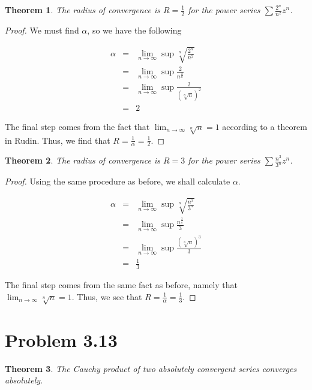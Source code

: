 \documentclass[psamsfonts]{amsart}
\newtheorem{thm}{Theorem}[section]
\theoremstyle{definition}
\theoremstyle{remark}
\numberwithin{equation}{section}
\begin{document}
\begin{thm}
The radius of convergence is $R = \frac{1}{2} $ for the power series $\sum \frac{2^n}{n^2} z^n$. 
\end{thm}

\begin{proof}
We must find $\alpha$, so we have the following

\begin{eqnarray}
\alpha &=&  \lim_{n \to \infty} \sup \sqrt[n]{\frac{2^n}{n^2}} \\
&=& \lim_{n \to \infty} \sup \frac{2}{n^{\frac{2}{n}}} \\
&=& \lim_{n \to \infty} \sup \frac{2}{(\sqrt[n]{n})^2} \\
&=& 2
\end{eqnarray}

The final step comes from the fact that $\lim_{n \to \infty} \sqrt[n]{n} = 1$ according to a theorem in Rudin. Thus, we find that $ R = \frac{1}{\alpha} = \frac{1}{2}$. 
\end{proof}

\begin{thm}
The radius of convergence is $R = 3 $ for the power series $\sum \frac{n^3}{3^n} z^n$. 
\end{thm}

\begin{proof}
Using the same procedure as before, we shall calculate $\alpha$.

\begin{eqnarray}
\alpha &=& \lim_{n \to \infty} \sup \sqrt[n]{\frac{n^3}{3^n}} \\
&=& \lim_{n \to \infty} \sup \frac{n^{\frac{3}{n}}}{3} \\
&=& \lim_{n \to \infty} \sup \frac{(\sqrt[n]{n})^3}{3} \\
&=& \frac{1}{3}
\end{eqnarray}

The final step comes from the same fact as before, namely that $\lim_{n \to \infty} \sqrt[n]{n} = 1$. Thus, we see that $R = \frac{1}{\alpha} = \frac{1}{3}$. 
\end{proof}

\section{Problem 3.13}

\begin{thm}
The Cauchy product of two absolutely convergent series converges absolutely.
\end{thm}
\end{document}
